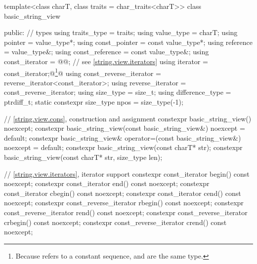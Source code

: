 %
%
%
%
%
%
%
%
%
%
%
%
%
\begin{codeblock}
template<class charT, class traits = char_traits<charT>>
class basic_string_view {
public:
  // types
  using traits_type            = traits;
  using value_type             = charT;
  using pointer                = value_type*;
  using const_pointer          = const value_type*;
  using reference              = value_type&;
  using const_reference        = const value_type&;
  using const_iterator         = @@; // see \ref{string.view.iterators}
  using iterator               = const_iterator;@\footnote{Because  refers to a constant sequence,  and  are the same type.}@
  using const_reverse_iterator = reverse_iterator<const_iterator>;
  using reverse_iterator       = const_reverse_iterator;
  using size_type              = size_t;
  using difference_type        = ptrdiff_t;
  static constexpr size_type npos = size_type(-1);

  // \ref{string.view.cons}, construction and assignment
  constexpr basic_string_view() noexcept;
  constexpr basic_string_view(const basic_string_view&) noexcept = default;
  constexpr basic_string_view& operator=(const basic_string_view&) noexcept = default;
  constexpr basic_string_view(const charT* str);
  constexpr basic_string_view(const charT* str, size_type len);

  // \ref{string.view.iterators}, iterator support
  constexpr const_iterator begin() const noexcept;
  constexpr const_iterator end() const noexcept;
  constexpr const_iterator cbegin() const noexcept;
  constexpr const_iterator cend() const noexcept;
  constexpr const_reverse_iterator rbegin() const noexcept;
  constexpr const_reverse_iterator rend() const noexcept;
  constexpr const_reverse_iterator crbegin() const noexcept;
  constexpr const_reverse_iterator crend() const noexcept;

}
\end{codeblock}
